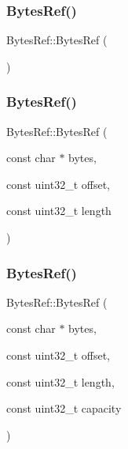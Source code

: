 \subsubsection{\texorpdfstring{Bytes\+Ref()}{BytesRef()}\hspace{0.1cm}{\footnotesize\ttfamily [1/7]}}
{\footnotesize\ttfamily Bytes\+Ref\+::\+Bytes\+Ref (\begin{DoxyParamCaption}{ }\end{DoxyParamCaption})}

\mbox{\label{classlucene_1_1core_1_1util_1_1BytesRef_aafacc8aec4dc0494f42d91876b64bb17}} 
\subsubsection{\texorpdfstring{Bytes\+Ref()}{BytesRef()}\hspace{0.1cm}{\footnotesize\ttfamily [2/7]}}
{\footnotesize\ttfamily Bytes\+Ref\+::\+Bytes\+Ref (\begin{DoxyParamCaption}\item[{const char $\ast$}]{bytes,  }\item[{const uint32\+\_\+t}]{offset,  }\item[{const uint32\+\_\+t}]{length }\end{DoxyParamCaption})}

\mbox{\label{classlucene_1_1core_1_1util_1_1BytesRef_a3cb2618be430384290cd84c488f8b07d}} 
\subsubsection{\texorpdfstring{Bytes\+Ref()}{BytesRef()}\hspace{0.1cm}{\footnotesize\ttfamily [3/7]}}
{\footnotesize\ttfamily Bytes\+Ref\+::\+Bytes\+Ref (\begin{DoxyParamCaption}\item[{const char $\ast$}]{bytes,  }\item[{const uint32\+\_\+t}]{offset,  }\item[{const uint32\+\_\+t}]{length,  }\item[{const uint32\+\_\+t}]{capacity }\end{DoxyParamCaption})}

